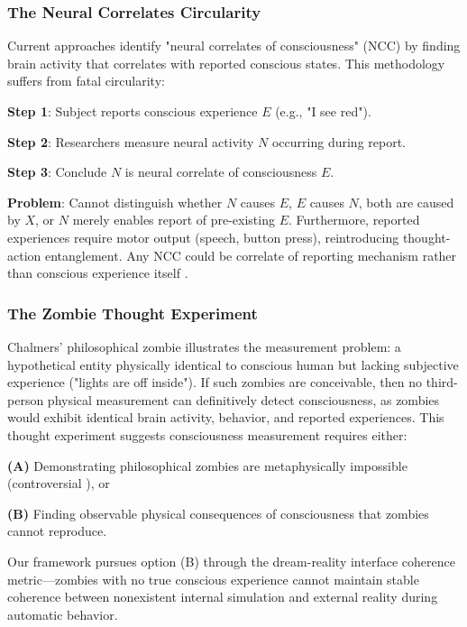 \documentclass[11pt,onecolumn]{article}
\begin{document}
\subsubsection{The Neural Correlates Circularity}

Current approaches identify "neural correlates of consciousness" (NCC) \citep{crick1990towards,koch2016neural} by finding brain activity that correlates with reported conscious states. This methodology suffers from fatal circularity:

\textbf{Step 1}: Subject reports conscious experience $E$ (e.g., "I see red").

\textbf{Step 2}: Researchers measure neural activity $N$ occurring during report.

\textbf{Step 3}: Conclude $N$ is neural correlate of consciousness $E$.

\textbf{Problem}: Cannot distinguish whether $N$ causes $E$, $E$ causes $N$, both are caused by $X$, or $N$ merely enables report of pre-existing $E$. Furthermore, reported experiences require motor output (speech, button press), reintroducing thought-action entanglement. Any NCC could be correlate of reporting mechanism rather than conscious experience itself \citep{block2007consciousness}.

\subsubsection{The Zombie Thought Experiment}

Chalmers' philosophical zombie \citep{chalmers1996conscious} illustrates the measurement problem: a hypothetical entity physically identical to conscious human but lacking subjective experience ("lights are off inside"). If such zombies are conceivable, then no third-person physical measurement can definitively detect consciousness, as zombies would exhibit identical brain activity, behavior, and reported experiences. This thought experiment suggests consciousness measurement requires either:

\textbf{(A)} Demonstrating philosophical zombies are metaphysically impossible (controversial \citep{kirk2019zombies}), or

\textbf{(B)} Finding observable physical consequences of consciousness that zombies cannot reproduce.

Our framework pursues option (B) through the dream-reality interface coherence metric---zombies with no true conscious experience cannot maintain stable coherence between nonexistent internal simulation and external reality during automatic behavior.
\end{document}
